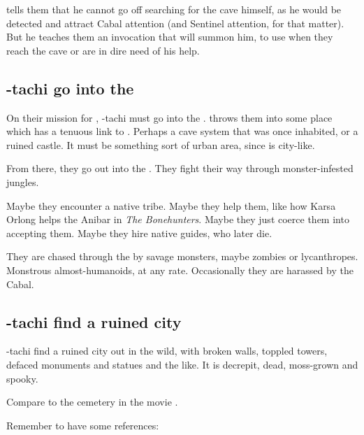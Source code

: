 \Ishnaruchaefir{} tells them that he cannot go off searching for the cave himself, as he would be detected and attract Cabal attention (and Sentinel attention, for that matter). But he teaches them an invocation that will summon him, to use when they reach the cave or are in dire need of his help. 








\subsection{\Shilred-tachi go into the \Wylde}
On their mission for \Ishna, \Shilred-tachi must go into the \Wylde{}. \Ishnaruchaefir{} throws them into some place which has a tenuous link to \Nyx. Perhaps a cave system that was once inhabited, or a ruined castle. It must be something sort of urban area, since \Nyx{} is city-like. 

From there, they go out into the \Wylde{}. They fight their way through monster-infested jungles. 

Maybe they encounter a native tribe. Maybe they help them, like how Karsa Orlong helps the Anibar in \emph{The Bonehunters}. Maybe they just coerce them into accepting them. Maybe they hire native guides, who later die. 

They are chased through the \Wylde{} by savage monsters, maybe zombies or lycanthropes. Monstrous almost-humanoids, at any rate. Occasionally they are harassed by the Cabal. 







\subsection{\Shilred-tachi find a ruined city}
\Shilred-tachi find a ruined city out in the wild, with broken walls, toppled towers, defaced monuments and statues and the like. It is decrepit, dead, moss-grown and spooky. 

Compare to the cemetery in the movie \cite{Movie:HouseoftheDead}. 

Remember to have some references: 

